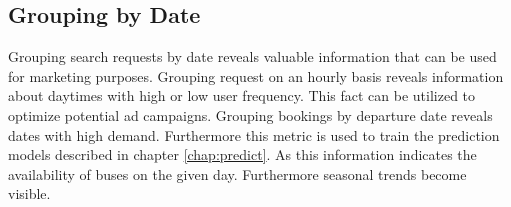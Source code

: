 \subsection{Grouping by Date}
Grouping search requests by date reveals valuable information that can be used for marketing purposes. Grouping request on an hourly basis reveals information about daytimes with high or low user frequency. This fact can be utilized to optimize potential ad campaigns. Grouping bookings by departure date reveals dates with high demand. Furthermore this metric is used to train the prediction models described in chapter \ref{chap:predict}. As this information indicates the availability of buses on the given day. Furthermore seasonal trends become visible.\newline






